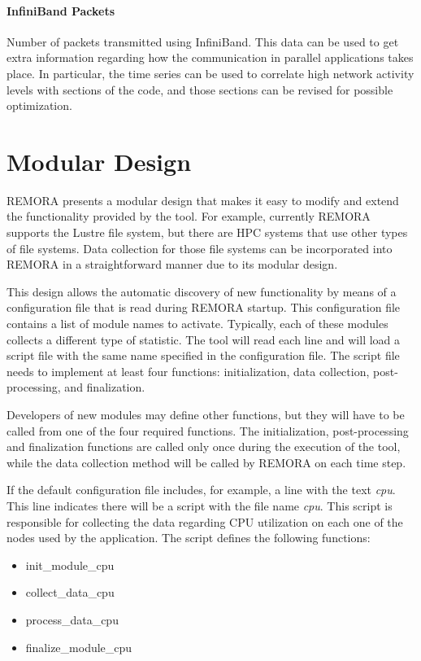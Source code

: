 \documentclass[10pt,a4paper]{report}
\begin{document}
\paragraph{InfiniBand Packets}
Number of packets transmitted using InfiniBand. This data can be used to get extra information regarding how the communication in parallel applications takes place. In particular, the time series can be used to correlate high network activity levels with sections of the code, and those sections can be revised for possible optimization.

\FloatBarrier
\section{Modular Design}
REMORA presents a modular design that makes it easy to modify and extend the functionality 
provided by the tool. For example, currently REMORA supports
the Lustre file system, but there are HPC systems that use other types of file systems.
Data collection for those file systems can be incorporated into REMORA in a straightforward
manner due to its modular design.

This design allows the automatic discovery of new functionality by means of a configuration
file that is read during REMORA startup. This configuration file contains
a list of module names to activate. Typically, each of these modules collects a 
different type of statistic. The tool will read each line and will load a
script file with the same name specified in the configuration file. The script file needs
to implement at least four functions: initialization, data collection, post-processing, and 
finalization.

Developers of new modules may define other functions,
but they will have to be called from one of the four required functions. The initialization,
post-processing and finalization functions are called only once during the execution of the
tool, while the data collection method will be called by REMORA on each time step.

If the default configuration file includes, for example, a line with the text \textit{cpu}.
This line indicates there will be a script with the file name \textit{cpu}. This script
is responsible for collecting the data regarding CPU utilization on each one of the
nodes used by the application. The script defines the following functions:

\begin{itemize}
	\item init\_module\_cpu
	\item collect\_data\_cpu
	\item process\_data\_cpu
	\item finalize\_module\_cpu
\end{itemize}
\end{document}

